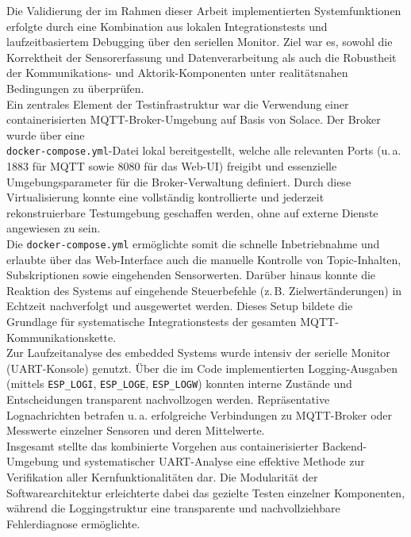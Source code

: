 Die Validierung der im Rahmen dieser Arbeit implementierten Systemfunktionen erfolgte durch eine Kombination aus lokalen Integrationstests und laufzeitbasiertem Debugging über den seriellen Monitor. Ziel war es, sowohl die Korrektheit der Sensorerfassung und Datenverarbeitung als auch die Robustheit der Kommunikations- und Aktorik-Komponenten unter realitätsnahen Bedingungen zu überprüfen.
\\
Ein zentrales Element der Testinfrastruktur war die Verwendung einer containerisierten MQTT-Broker-Umgebung auf Basis von Solace. Der Broker wurde über eine \\\texttt{docker-compose.yml}-Datei lokal bereitgestellt, welche alle relevanten Ports (u.\,a. 1883 für MQTT sowie 8080 für das Web-UI) freigibt und essenzielle Umgebungsparameter für die Broker-Verwaltung definiert. Durch diese Virtualisierung konnte eine vollständig kontrollierte und jederzeit rekonstruierbare Testumgebung geschaffen werden, ohne auf externe Dienste angewiesen zu sein.
\\
Die \texttt{docker-compose.yml} ermöglichte somit die schnelle Inbetriebnahme und erlaubte über das Web-Interface auch die manuelle Kontrolle von Topic-Inhalten, Subskriptionen sowie eingehenden Sensorwerten. Darüber hinaus konnte die Reaktion des Systems auf eingehende Steuerbefehle (z.\,B. Zielwertänderungen) in Echtzeit nachverfolgt und ausgewertet werden. Dieses Setup bildete die Grundlage für systematische Integrationstests der gesamten MQTT-Kommunikationskette.
\\
Zur Laufzeitanalyse des embedded Systems wurde intensiv der serielle Monitor (UART-Konsole) genutzt. Über die im Code implementierten Logging-Ausgaben (mittels \texttt{ESP\_LOGI}, \texttt{ESP\_LOGE}, \texttt{ESP\_LOGW}) konnten interne Zustände und Entscheidungen transparent nachvollzogen werden. Repräsentative Lognachrichten betrafen u.\,a. erfolgreiche Verbindungen zu MQTT-Broker oder Messwerte einzelner Sensoren und deren Mittelwerte.
\\
Insgesamt stellte das kombinierte Vorgehen aus containerisierter Backend-Umgebung und systematischer UART-Analyse eine effektive Methode zur Verifikation aller Kernfunktionalitäten dar. Die Modularität der Softwarearchitektur erleichterte dabei das gezielte Testen einzelner Komponenten, während die Loggingstruktur eine transparente und nachvollziehbare Fehlerdiagnose ermöglichte.


